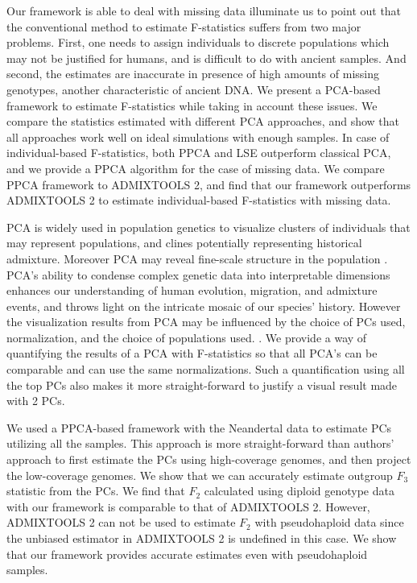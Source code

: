 \documentclass[12pt, letterpaper]{article}
\begin{document}
Our framework is able to deal with missing data illuminate us to point out that the conventional method to estimate F-statistics suffers from two major problems. First, one needs to assign individuals to discrete populations which may not be justified for humans, and is difficult to do with ancient samples. And second, the estimates are inaccurate in presence of high amounts of missing genotypes, another characteristic of ancient DNA. We present a PCA-based framework to estimate F-statistics while taking in account these issues. We compare the statistics estimated with different PCA approaches, and show that all approaches work well on ideal simulations with enough samples. In case of individual-based F-statistics, both PPCA and LSE outperform classical PCA, and we provide a PPCA algorithm for the case of missing data. We compare PPCA framework to ADMIXTOOLS 2, and find that our framework outperforms ADMIXTOOLS 2 to estimate individual-based F-statistics with missing data.  

PCA is widely used in population genetics to visualize clusters of individuals that may represent populations, and clines potentially representing historical admixture. Moreover PCA may reveal fine-scale structure in the population \cite{waldman_genome-wide_2022}. PCA's ability to condense complex genetic data into interpretable dimensions enhances our understanding of human evolution, migration, and admixture events, and throws light on the intricate mosaic of our species' history. However the visualization results from PCA may be influenced by the choice of PCs used, normalization, and the choice of populations used. \cite{elhaik_principal_2022}. We provide a way of quantifying the results of a PCA with F-statistics so that all PCA's can be comparable and can use the same normalizations. Such a quantification using all the top PCs also makes it more straight-forward to justify a visual result made with 2 PCs.

We used a PPCA-based framework with the Neandertal data to estimate PCs utilizing all the samples. This approach is more straight-forward than authors' approach to first estimate the PCs using high-coverage genomes, and then project the low-coverage genomes. We show that we can accurately estimate outgroup $F_3$ statistic from the PCs. We find that $F_2$ calculated using diploid genotype data with our framework is comparable to that of ADMIXTOOLS 2. However, ADMIXTOOLS 2 can not be used to estimate $F_2$ with pseudohaploid data since the unbiased estimator in ADMIXTOOLS 2 is undefined in this case. We show that our framework provides accurate estimates even with pseudohaploid samples. 
\end{document}
